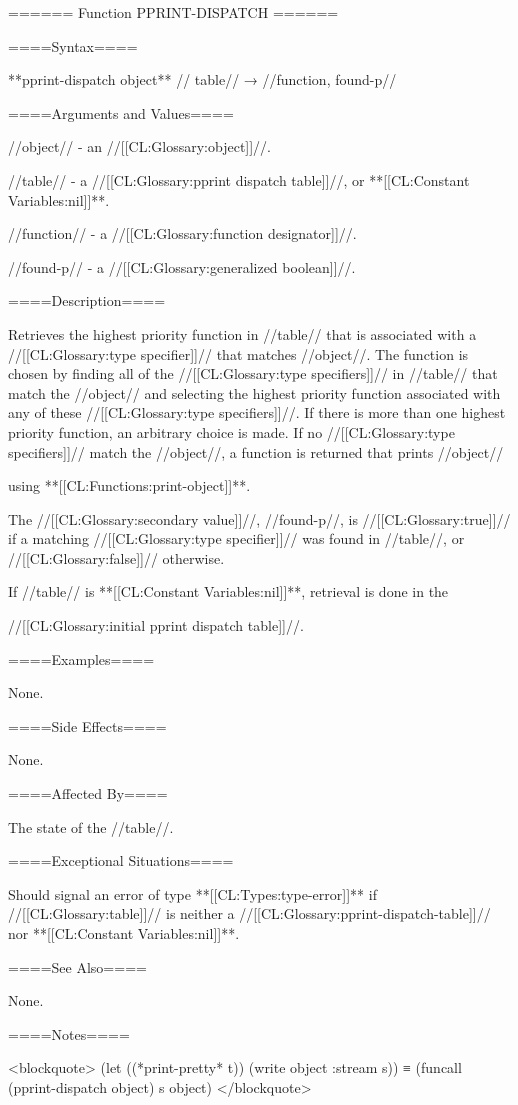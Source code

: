 ====== Function PPRINT-DISPATCH ======

====Syntax====

**pprint-dispatch {object** //\opt} table// → //function, found-p//

====Arguments and Values====

//object// - an //[[CL:Glossary:object]]//.

//table// - a //[[CL:Glossary:pprint dispatch table]]//, or **[[CL:Constant Variables:nil]]**. 

//function// - a //[[CL:Glossary:function designator]]//.

//found-p// - a //[[CL:Glossary:generalized boolean]]//.

====Description====

Retrieves the highest priority function in //table// that is associated with a //[[CL:Glossary:type specifier]]// that matches //object//. The function is chosen by finding all of the //[[CL:Glossary:type specifiers]]// in //table// that match the //object// and selecting the highest priority function associated with any of these //[[CL:Glossary:type specifiers]]//. If there is more than one highest priority function, an arbitrary choice is made. If no //[[CL:Glossary:type specifiers]]// match the //object//, a function is returned that prints //object//

using **[[CL:Functions:print-object]]**.

The //[[CL:Glossary:secondary value]]//, //found-p//, is //[[CL:Glossary:true]]// if a matching //[[CL:Glossary:type specifier]]// was found in //table//, or //[[CL:Glossary:false]]// otherwise.

If //table// is **[[CL:Constant Variables:nil]]**, retrieval is done in the

//[[CL:Glossary:initial pprint dispatch table]]//.

====Examples====

None.

====Side Effects====

None.

====Affected By====

The state of the //table//.

====Exceptional Situations====

Should signal an error of type **[[CL:Types:type-error]]** if //[[CL:Glossary:table]]// is neither a //[[CL:Glossary:pprint-dispatch-table]]// nor **[[CL:Constant Variables:nil]]**.

====See Also====

None.

====Notes====

<blockquote> (let ((*print-pretty* t)) (write object :stream s)) ≡ (funcall (pprint-dispatch object) s object) </blockquote>

 
